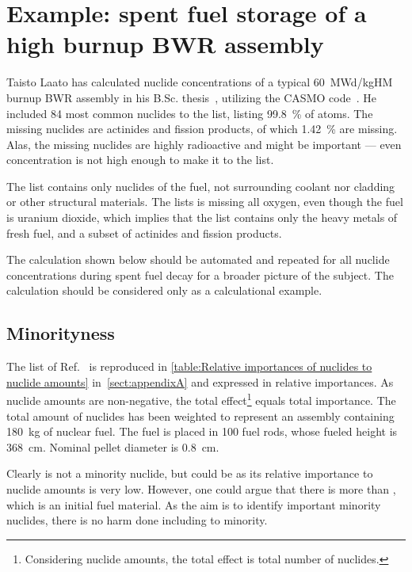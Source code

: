 \section{Example: spent fuel storage of a high burnup BWR assembly}
\label{sect:example}

Taisto Laato has calculated nuclide concentrations of a typical \SI{60}{MWd/kgHM} burnup BWR assembly in his B.Sc. thesis~\cite{Laato2011}, utilizing the CASMO code~\cite{casmo4,casmo4e}. He included \num{84} most common nuclides to the list, listing \SI{99.8}{\%} of atoms. The missing nuclides are actinides and fission products, of which \SI{1.42}{\%} are missing. Alas, the missing nuclides are highly radioactive and might be important --- even  concentration is not high enough to make it to the list.

The list contains only nuclides of the fuel, not surrounding coolant nor cladding or other structural materials. The lists is missing all oxygen, even though the fuel is uranium dioxide, which implies that the list contains only the heavy metals of fresh fuel, and a subset of actinides and fission products.

The calculation shown below should be automated and repeated for all nuclide concentrations during spent fuel decay for a broader picture of the subject. The calculation should be considered only as a calculational example.

\subsection{Minorityness}

The list of Ref.~\cite[Appendix B]{Laato2011} is reproduced in \autoref{table:Relative importances of nuclides to nuclide amounts} in~\autoref{sect:appendixA} and expressed in relative importances. As nuclide amounts are non-negative, the total effect\footnote{Considering nuclide amounts, the total effect is total number of nuclides.} equals total importance. The total amount of nuclides has been weighted to represent an assembly containing \SI{180}{kg} of nuclear fuel. The fuel is placed in \num{100} fuel rods, whose fueled height is \SI{368}{cm}. Nominal pellet diameter is \SI{0.8}{cm}.

Clearly  is not a minority nuclide, but  could be as its relative importance to nuclide amounts is very low. However, one could argue that there is more  than , which is an initial fuel material. As the aim is to identify important minority nuclides, there is no harm done including  to minority.

